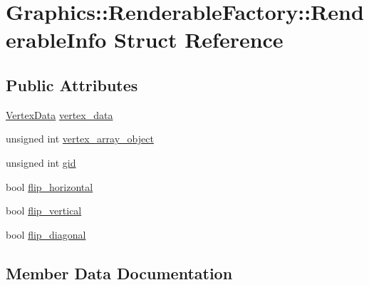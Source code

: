 \hypertarget{struct_graphics_1_1_renderable_factory_1_1_renderable_info}{}\section{Graphics\+:\+:Renderable\+Factory\+:\+:Renderable\+Info Struct Reference}
\label{struct_graphics_1_1_renderable_factory_1_1_renderable_info}
\subsection*{Public Attributes}
\begin{DoxyCompactItemize}
\item 
\hyperlink{class_graphics_1_1_vertex_data}{Vertex\+Data} \hyperlink{struct_graphics_1_1_renderable_factory_1_1_renderable_info_ae8b3c7fd7d012a24ce61dc878503500c}{vertex\+\_\+data}
\item 
unsigned int \hyperlink{struct_graphics_1_1_renderable_factory_1_1_renderable_info_a61188b98760e4fb1e49f52a58a1ad52e}{vertex\+\_\+array\+\_\+object}
\item 
unsigned int \hyperlink{struct_graphics_1_1_renderable_factory_1_1_renderable_info_ac1340431d269fef6cd0d71905dfe61e9}{gid}
\item 
bool \hyperlink{struct_graphics_1_1_renderable_factory_1_1_renderable_info_a46aa1a283ffb8cb5f964fcd91fe3050a}{flip\+\_\+horizontal}
\item 
bool \hyperlink{struct_graphics_1_1_renderable_factory_1_1_renderable_info_a9019db5a8f057eb934e70caf7c173cef}{flip\+\_\+vertical}
\item 
bool \hyperlink{struct_graphics_1_1_renderable_factory_1_1_renderable_info_a04e2009f81474c104cd28fd6c92b6613}{flip\+\_\+diagonal}
\end{DoxyCompactItemize}


\subsection{Member Data Documentation}
\hypertarget{struct_graphics_1_1_renderable_factory_1_1_renderable_info_a04e2009f81474c104cd28fd6c92b6613}{}
